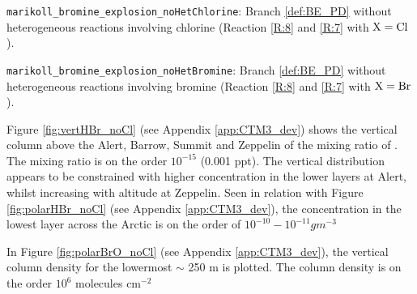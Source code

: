 \begin{mydef}\label{def:BE_PD_noCl}
    \texttt{marikoll\_bromine\_explosion\_noHetChlorine}: Branch \ref{def:BE_PD} without heterogeneous reactions involving chlorine (Reaction \ref{R:8} and \ref{R:7} with $\mathrm{X} = \mathrm{Cl}$).
\end{mydef}

\begin{mydef}\label{def:BE_PD_noBr}
    \texttt{marikoll\_bromine\_explosion\_noHetBromine}: Branch \ref{def:BE_PD} without heterogeneous reactions involving bromine (Reaction \ref{R:8} and \ref{R:7} with $\mathrm{X} = \mathrm{Br}$).
\end{mydef}








\medskip

Figure \ref{fig:vertHBr_noCl} (see Appendix \ref{app:CTM3_dev}) shows the vertical column above the Alert, Barrow, Summit and Zeppelin of the mixing ratio of . The mixing ratio is on the order $10^{-15}$ (0.001 ppt). The vertical distribution appears to be constrained with higher concentration in the lower layers at Alert, whilst increasing with altitude at Zeppelin. Seen in relation with Figure \ref{fig:polarHBr_noCl} (see Appendix \ref{app:CTM3_dev}), the concentration in the lowest layer across the Arctic is on the order of $10^{-10} - 10^{-11} g m^{-3}$

\medskip

In Figure \ref{fig:polarBrO_noCl} (see Appendix \ref{app:CTM3_dev}), the vertical column density for the lowermost $\sim$ 250 m is plotted. The column density is on the order $10^{6}$ molecules cm$^{-2}$




%

%

%

